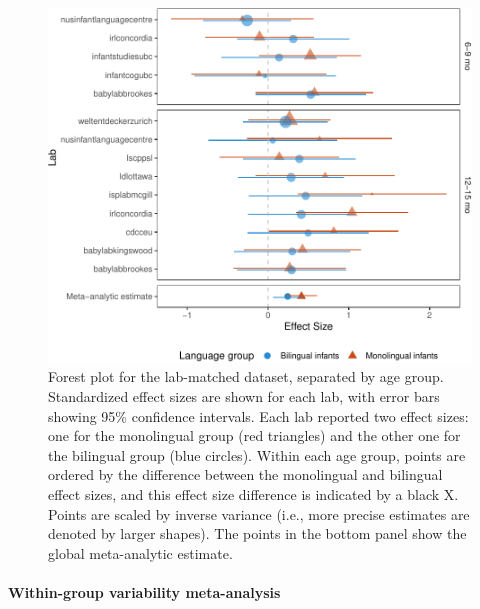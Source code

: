 \documentclass[,man,floatsintext]{apa6}
\let\oldparagraph\paragraph
\renewcommand{\paragraph}[1]{\oldparagraph{#1}\mbox{}}
\begin{document}
\begin{figure}
\centering
\includegraphics{mb1b-paper_files/figure-latex/unnamed-chunk-3-1.pdf}
\caption{\label{fig:unnamed-chunk-3}Forest plot for the lab-matched dataset, separated by age group. Standardized effect sizes are shown for each lab, with error bars showing 95\% confidence intervals. Each lab reported two effect sizes: one for the monolingual group (red triangles) and the other one for the bilingual group (blue circles). Within each age group, points are ordered by the difference between the monolingual and bilingual effect sizes, and this effect size difference is indicated by a black X. Points are scaled by inverse variance (i.e., more precise estimates are denoted by larger shapes). The points in the bottom panel show the global meta-analytic estimate.}
\end{figure}

\hypertarget{within-group-variability-meta-analysis}{%
\paragraph{Within-group variability meta-analysis}\label{within-group-variability-meta-analysis}}
\end{document}
